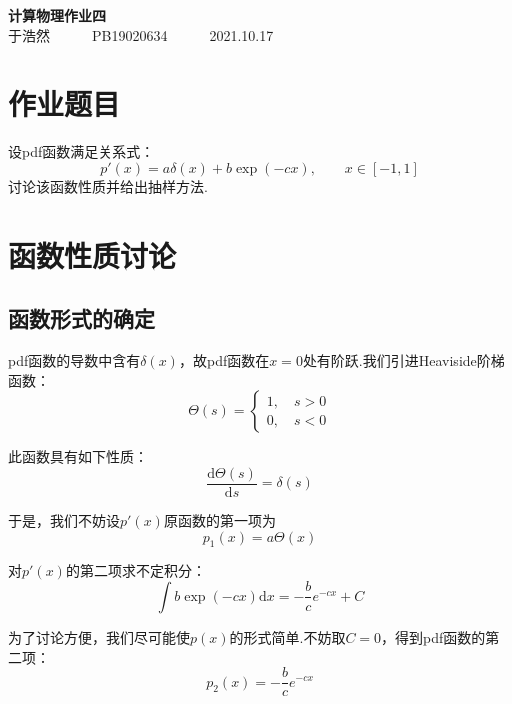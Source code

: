\documentclass[12pt,a4paper,utf8]{ctexart}
\begin{document}
\begin{center}
    {\LARGE\textbf{计算物理作业四}}\\
    \textrm{于浩然}~~~~~~\textrm{PB19020634}~~~~~~\textrm{2021.10.17}
\end{center}

\section{作业题目}

设pdf函数满足关系式：
\begin{equation}
    p'(x)=a \delta (x)+b \exp (-cx), \qquad x \in [-1,1]
\end{equation}
讨论该函数性质并给出抽样方法.

\section{函数性质讨论}

\subsection{函数形式的确定}

pdf函数的导数中含有$\delta(x)$，故pdf函数在$x=0$处有阶跃.我们引进Heaviside阶梯函数：
\begin{equation}
    \Theta (s) = 
    \begin{cases}
        1,\quad s>0 \\
        0,\quad s<0 
    \end{cases}
\end{equation}

此函数具有如下性质：
\begin{equation}
    \frac{ \textrm{d}\Theta (s)}{ \textrm{d}s} = \delta (s)
\end{equation}

于是，我们不妨设$p'(x)$原函数的第一项为
\begin{equation}
    p_1(x) = a \Theta (x)
\end{equation}

对$p'(x)$的第二项求不定积分：
\begin{equation}
    \int b \exp(-cx) \textrm{d}x= - \frac{b}{c} e^{-cx} + C
\end{equation}

为了讨论方便，我们尽可能使$p(x)$的形式简单.不妨取$C=0$，得到pdf函数的第二项：
\begin{equation}
    p_2(x) = - \frac{b}{c} e^{-cx}
\end{equation}
\end{document}

